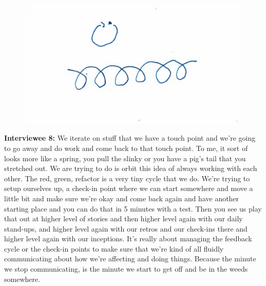 \begin{figure}[H]
\centering
\includegraphics[width=6.5in]{interviews/drawings/2015_08_12_se.png}
\caption{}
\end{figure}

\textbf{Interviewee 8:} We iterate on stuff that we have a touch point and we're going to go away and do work and come back to that touch point. To me, it sort of looks more like a spring, you pull the slinky or you have a pig's tail that you stretched out. We are trying to do is orbit this idea of always working with each other. The red, green, refactor is a very tiny cycle that we do. We're trying to setup ourselves up, a check-in point where we can start somewhere and move a little bit and make sure we're okay and come back again and have another starting place and you can do that in 5 minutes with a test. Then you see us play that out at higher level of stories and then higher level again with our daily stand-ups, and higher level again with our retros and our check-ins there and higher level again with our inceptions. It's really about managing the feedback cycle or the check-in points to make sure that we're kind of all fluidly communicating about how we're affecting and doing things. Because the minute we stop communicating, is the minute we start to get off and be in the weeds somewhere.



